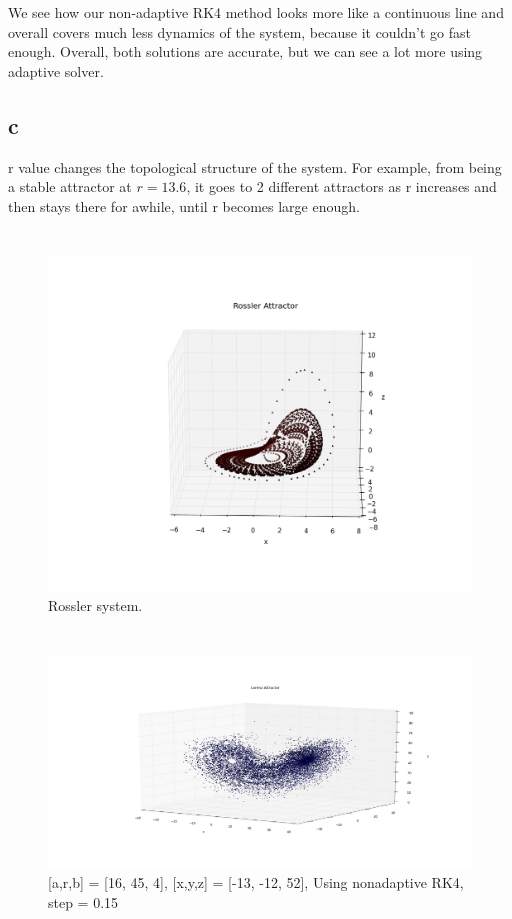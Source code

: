 \documentclass[12pt]{article}\pagestyle{myheadings}
\theoremstyle{plain}
\begin{document}
We see how our non-adaptive RK4 method looks more like a continuous line and overall covers much less dynamics of the system, because it couldn't go fast enough. Overall, both solutions are accurate, but we can see a lot more using adaptive solver. 


\subsection{c}

r value changes the topological structure of the system. For example, from being a stable attractor at $r=13.6$, it goes to 2 different attractors as r increases and then stays there for awhile, until r becomes large enough. 

\section{}
\begin{figure}[H]
\centering
\includegraphics[scale=.85]{rossler}
\caption{Rossler system. }
\label{fig:my_label}
\end{figure}

\section{}

\begin{figure}[H]
\centering
\includegraphics[scale=.45]{4_barely}
\caption{[a,r,b] = [16, 45, 4], [x,y,z] = [-13, -12, 52], Using nonadaptive RK4, step = 0.15}
\label{fig:my_label}
\end{figure}
\end{document}

